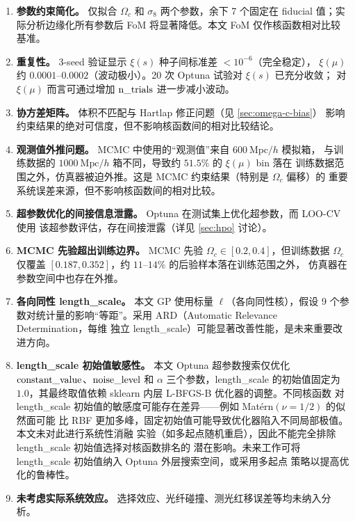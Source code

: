 \begin{enumerate}
  \item \textbf{参数约束简化。} 仅拟合 $\Omega_c$ 和 $\sigma_8$ 两个参数，余下 7 个固定在
    fiducial 值；实际分析边缘化所有参数后 FoM 将显著降低。本文 FoM 仅作核函数相对比较基准。
  \item \textbf{重复性。} 3-seed 验证显示 $\xi(s)$ 种子间标准差 ${<}10^{-6}$（完全稳定），
    $\xi(\mu)$ 约 $0.0001$--$0.0002$（波动极小）。20 次 Optuna 试验对 $\xi(s)$ 已充分收敛；
    对 $\xi(\mu)$ 而言可通过增加 ${\rm n\_trials}$ 进一步减小波动。
  \item \textbf{协方差矩阵。} 体积不匹配与 Hartlap 修正问题（见 \autoref{sec:omega-c-bias}）
    影响约束结果的绝对可信度，但不影响核函数间的相对比较结论。
  \item \textbf{观测值外推问题。} MCMC 中使用的``观测值''来自 $600~\mathrm{Mpc}/h$ 模拟箱，
    与训练数据的 $1000~\mathrm{Mpc}/h$ 箱不同，导致约 $51.5\%$ 的 $\xi(\mu)$ bin 落在
    训练数据范围之外，仿真器被迫外推。这是 MCMC 约束结果（特别是 $\Omega_c$ 偏移）的
    重要系统误差来源，但不影响核函数间的相对比较。
  \item \textbf{超参数优化的间接信息泄露。} Optuna 在测试集上优化超参数，而 LOO-CV 使用
    该超参数评估，存在间接泄露（详见 \autoref{sec:hpo} 讨论）。
  \item \textbf{MCMC 先验超出训练边界。} MCMC 先验 $\Omega_c\in[0.2,0.4]$，但训练数据
    $\Omega_c$ 仅覆盖 $[0.187,0.352]$，约 $11$--$14\%$ 的后验样本落在训练范围之外，
    仿真器在参数空间中也存在外推。
  \item \textbf{各向同性 length\_scale。} 本文 GP 使用标量 $\ell$（各向同性核），假设
    9 个参数对统计量的影响``等距''。采用 ARD（Automatic Relevance Determination，每维
    独立 length\_scale）可能显著改善性能，是未来重要改进方向。
  \item \textbf{length\_scale 初始值敏感性。} 本文 Optuna 超参数搜索仅优化
    ${\rm constant\_value}$、${\rm noise\_level}$ 和 $\alpha$ 三个参数，length\_scale
    的初始值固定为 $1.0$，其最终取值依赖 sklearn 内层 L-BFGS-B 优化器的调整。不同核函数
    对 length\_scale 初始值的敏感度可能存在差异——例如 Mat\'ern$(\nu=1/2)$ 的似然面可能
    比 RBF 更加多峰，固定初始值可能导致优化器陷入不同局部极值。本文未对此进行系统性消融
    实验（如多起点随机重启），因此不能完全排除 length\_scale 初始值选择对核函数排名的
    潜在影响。未来工作可将 length\_scale 初始值纳入 Optuna 外层搜索空间，或采用多起点
    策略以提高优化的鲁棒性。
  \item \textbf{未考虑实际系统效应。} 选择效应、光纤碰撞、测光红移误差等均未纳入分析。
\end{enumerate}
